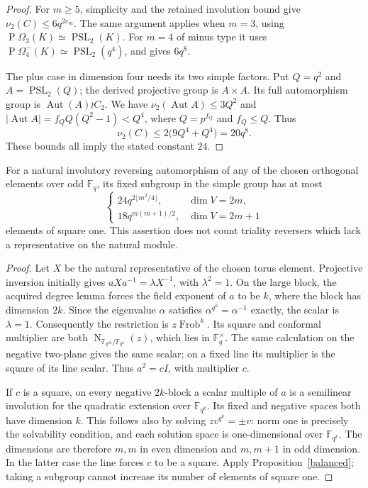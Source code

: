 \documentclass[11pt,a4paper]{article}
\newcommand{\F}{\mathbb F}\newcommand{\nuu}{\nu_2}
\newcommand{\Norm}{\operatorname{N}}
\begin{document}
\begin{proof}
For $m\ge5$, simplicity and the retained involution bound give
$\nuu(C)\le6q^{2e_m}$. The same argument applies when $m=3$, using
$\operatorname{P}\Omega_3(K)\simeq\operatorname{PSL}_2(K)$.
For $m=4$ of minus type it uses
$\operatorname{P}\Omega_4^-(K)\simeq\operatorname{PSL}_2(q^4)$,
and gives $6q^8$.

The plus case in dimension four needs its two simple factors. Put
$Q=q^2$ and $A=\operatorname{PSL}_2(Q)$; the derived projective group
is $A\times A$. Its full automorphism group is
$\operatorname{Aut}(A)\wr C_2$. We have
$\nuu(\operatorname{Aut}A)\le3Q^2$ and
$|\operatorname{Aut}A|=f_Q Q(Q^2-1)<Q^4$, where
$Q=p^{f_Q}$ and $f_Q\le Q$. Thus
\[
 \nuu(C)\le2\bigl(9Q^4+Q^4\bigr)=20q^8.
\]
These bounds all imply the stated constant $24$.
\end{proof}

\begin{proposition}\label{application}
For a natural involutory reversing automorphism of any of the chosen
orthogonal elements over odd $\F_q$, its fixed subgroup in the simple
group has at most
\[
 \begin{cases}
 24q^{2\lfloor m^2/4\rfloor},&\dim V=2m,\\
 18q^{m(m+1)/2},&\dim V=2m+1
 \end{cases}
\]
elements of square one. This assertion does not count triality
reversers which lack a representative on the natural module.
\end{proposition}
\begin{proof}
Let $X$ be the natural representative of the chosen torus element.
Projective inversion initially gives $aXa^{-1}=\lambda X^{-1}$,
with $\lambda^2=1$. On the large block, the acquired degree lemma
forces the field exponent of $a$ to be $k$, where the block has
dimension $2k$. Since the eigenvalue $\alpha$ satisfies
$\alpha^{q^k}=\alpha^{-1}$ exactly, the scalar is $\lambda=1$.
Consequently the restriction is $z\operatorname{Frob}^{k}$.
Its square and conformal multiplier are both
$\Norm_{\F_{q^{2k}}/\F_{q^k}}(z)$, which lies in $\F_q^\times$.
The same calculation on the negative two-plane gives the same scalar;
on a fixed line its multiplier is the square of its line scalar.
Thus $a^2=cI$, with multiplier $c$.

If $c$ is a square, on every negative $2k$-block a scalar multiple of
$a$ is a semilinear involution for the quadratic extension over
$\F_{q^k}$. Its fixed and negative spaces both have dimension $k$.
This follows also by solving $zv^{q^k}=\pm v$: norm one is precisely
the solvability condition, and each solution space is one-dimensional
over $\F_{q^k}$. The dimensions are therefore $m,m$ in even dimension
and $m,m+1$ in odd dimension. In the latter case the line forces $c$
to be a square. Apply Proposition~\ref{balanced}; taking a subgroup
cannot increase its number of elements of square one.
\end{proof}
\end{document}
